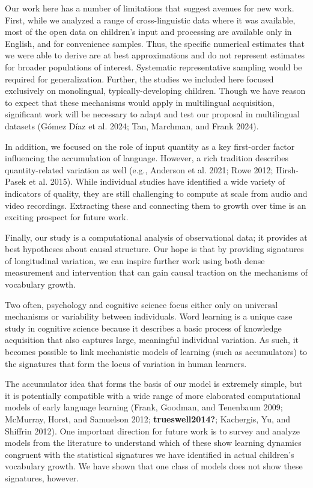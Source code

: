 \documentclass[
  11pt,
]{article}
\begin{document}
Our work here has a number of limitations that suggest avenues for new
work. First, while we analyzed a range of cross-linguistic data where it
was available, most of the open data on children's input and processing
are available only in English, and for convenience samples. Thus, the
specific numerical estimates that we were able to derive are at best
approximations and do not represent estimates for broader populations of
interest. Systematic representative sampling would be required for
generalization. Further, the studies we included here focused
exclusively on monolingual, typically-developing children. Though we
have reason to expect that these mechanisms would apply in multilingual
acquisition, significant work will be necessary to adapt and test our
proposal in multilingual datasets (Gómez Díaz et al. 2024; Tan,
Marchman, and Frank 2024).

In addition, we focused on the role of input quantity as a key
first-order factor influencing the accumulation of language. However, a
rich tradition describes quantity-related variation as well (e.g.,
Anderson et al. 2021; Rowe 2012; Hirsh-Pasek et al. 2015). While
individual studies have identified a wide variety of indicators of
quality, they are still challenging to compute at scale from audio and
video recordings. Extracting these and connecting them to growth over
time is an exciting prospect for future work.

Finally, our study is a computational analysis of observational data; it
provides at best hypotheses about causal structure. Our hope is that by
providing signatures of longitudinal variation, we can inspire further
work using both dense measurement and intervention that can gain causal
traction on the mechanisms of vocabulary growth.

Two often, psychology and cognitive science focus either only on
universal mechanisms or variability between individuals. Word learning
is a unique case study in cognitive science because it describes a basic
process of knowledge acquisition that also captures large, meaningful
individual variation. As such, it becomes possible to link mechanistic
models of learning (such as accumulators) to the signatures that form
the locus of variation in human learners.

The accumulator idea that forms the basis of our model is extremely
simple, but it is potentially compatible with a wide range of more
elaborated computational models of early language learning (Frank,
Goodman, and Tenenbaum 2009; McMurray, Horst, and Samuelson 2012;
\textbf{trueswell2014?}; Kachergis, Yu, and Shiffrin 2012). One
important direction for future work is to survey and analyze models from
the literature to understand which of these show learning dynamics
congruent with the statistical signatures we have identified in actual
children's vocabulary growth. We have shown that one class of models
does not show these signatures, however.
\end{document}
